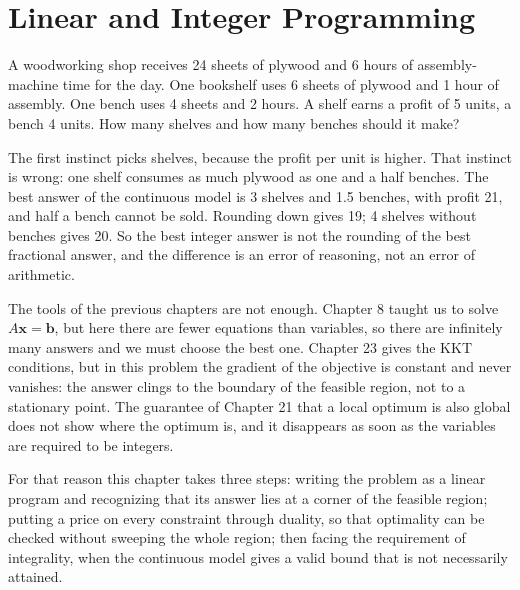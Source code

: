 \chapter{Linear and Integer Programming}

A woodworking shop receives 24 sheets of plywood and 6 hours of assembly-machine time for the
day. One bookshelf uses 6 sheets of plywood and 1 hour of assembly. One bench uses 4 sheets
and 2 hours. A shelf earns a profit of 5 units, a bench 4 units. How many shelves and how many
benches should it make?

The first instinct picks shelves, because the profit per unit is higher. That instinct is
wrong: one shelf consumes as much plywood as one and a half benches. The best answer of the
continuous model is 3 shelves and 1.5 benches, with profit 21, and half a bench cannot be
sold. Rounding down gives 19; 4 shelves without benches gives 20. So the best integer answer
is not the rounding of the best fractional answer, and the difference is an error of reasoning,
not an error of arithmetic.

The tools of the previous chapters are not enough. Chapter 8 taught us to solve
$A\mathbf{x}=\mathbf{b}$, but here there are fewer equations than variables, so there are
infinitely many answers and we must choose the best one. Chapter 23 gives the KKT conditions,
but in this problem the gradient of the objective is constant and never vanishes: the answer
clings to the boundary of the feasible region, not to a stationary point. The guarantee of
Chapter 21 that a local optimum is also global does not show where the optimum is, and it
disappears as soon as the variables are required to be integers.

For that reason this chapter takes three steps: writing the problem as a linear program and
recognizing that its answer lies at a corner of the feasible region; putting a price on every
constraint through duality, so that optimality can be checked without sweeping the whole
region; then facing the requirement of integrality, when the continuous model gives a valid
bound that is not necessarily attained.

